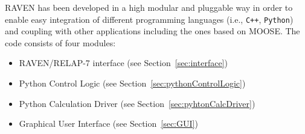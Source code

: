 \documentclass{mc2013}
\begin{document}

RAVEN has been developed in a high modular and pluggable way in order to enable easy integration of different programming languages (i.e., \verb!C++!, \verb!Python!) and coupling with other applications including the ones based on MOOSE. The code consists of four modules:
\begin{itemize}
\item RAVEN/RELAP-7 interface (see Section~\ref{sec:interface})
\item Python Control Logic (see Section~\ref{sec:pythonControlLogic})
\item Python Calculation Driver (see Section~\ref{sec:pyhtonCalcDriver})
\item Graphical User Interface (see Section~\ref{sec:GUI})
\end{itemize}
\end{document}
